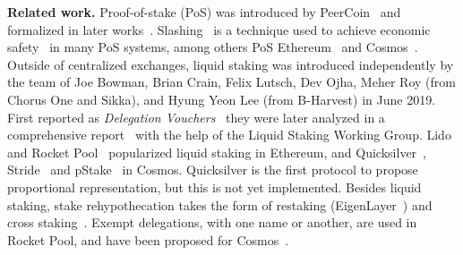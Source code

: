 \noindent
\textbf{Related work.}
Proof-of-stake (PoS) was introduced by PeerCoin~\cite{peercoin} and formalized
in later works~\cite{ouroboros,praos,ouroboros-genesis,algorand,DBLP:journals/iacr/BentovPS16a}.
Slashing~\cite{slashing} is a technique used to achieve economic safety~\cite{slashable-safety}
in many PoS systems, among others
PoS Ethereum~\cite{casper,buterin2020combining}
and Cosmos~\cite{2018tendermint,buchman2016tendermint,cosmossdk}.
Outside of centralized exchanges, liquid staking was introduced independently by
the team of Joe Bowman, Brian Crain, Felix Lutsch, Dev Ojha, Meher Roy (from Chorus One and Sikka),
and Hyung Yeon Lee (from B-Harvest) in June 2019.
First reported as \emph{Delegation Vouchers}~\cite{delegation-vouchers}
they were later analyzed in a comprehensive report~\cite{liquid-staking-report} with
the help of the Liquid Staking Working Group.
Lido~\cite{lido} and Rocket Pool~\cite{rocket-pool} popularized liquid staking
in Ethereum, and Quicksilver~\cite{quicksilver}, Stride~\cite{stride} and
pStake~\cite{pstake} in Cosmos. Quicksilver is the first protocol to propose proportional
representation, but this is not yet implemented.
Besides liquid staking, stake rehypothecation takes the form of
restaking (EigenLayer~\cite{eigenlayer}) and cross staking~\cite{mesh-security}.
Exempt delegations, with one name or another, are used in Rocket Pool,
and have been proposed for Cosmos~\cite{adr-liquid-staking}.
